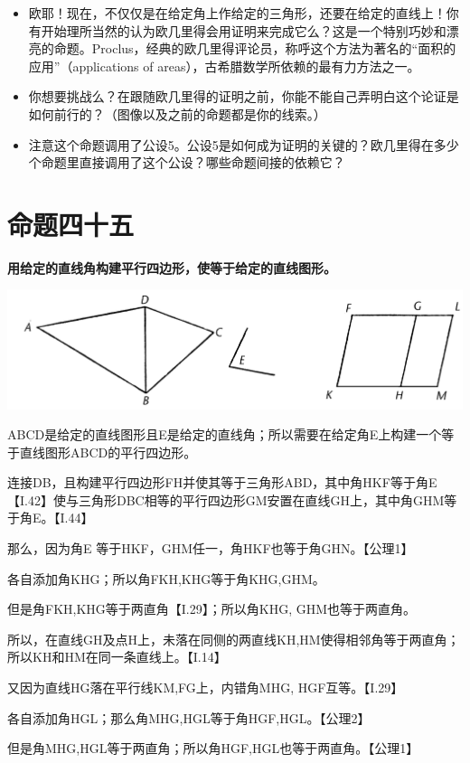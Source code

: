 \documentclass[
]{book}
\providecommand{\tightlist}{%
  \setlength{\itemsep}{0pt}\setlength{\parskip}{0pt}}
\begin{document}
\begin{itemize}
\tightlist
\item
  欧耶！现在，不仅仅是在给定角上作给定的三角形，还要在给定的直线上！你有开始理所当然的认为欧几里得会用证明来完成它么？这是一个特别巧妙和漂亮的命题。Proclus，经典的欧几里得评论员，称呼这个方法为著名的``面积的应用''（applications of areas），古希腊数学所依赖的最有力方法之一。
\item
  你想要挑战么？在跟随欧几里得的证明之前，你能不能自己弄明白这个论证是如何前行的？（图像以及之前的命题都是你的线索。）
\item
  注意这个命题调用了公设5。公设5是如何成为证明的关键的？欧几里得在多少个命题里直接调用了这个公设？哪些命题间接的依赖它？
\end{itemize}

\hypertarget{ux547dux9898ux56dbux5341ux4e94}{%
\section{命题四十五}\label{ux547dux9898ux56dbux5341ux4e94}}

\textbf{用给定的直线角构建平行四边形，使等于给定的直线图形。}

\includegraphics[width=0.5\linewidth]{./image/img549}

ABCD是给定的直线图形且E是给定的直线角；所以需要在给定角E上构建一个等于直线图形ABCD的平行四边形。

连接DB，且构建平行四边形FH并使其等于三角形ABD，其中角HKF等于角E【I.42】使与三角形DBC相等的平行四边形GM安置在直线GH上，其中角GHM等于角E。【I.44】

那么，因为角E 等于HKF，GHM任一，角HKF也等于角GHN。【公理1】

各自添加角KHG；所以角FKH,KHG等于角KHG,GHM。

但是角FKH,KHG等于两直角【I.29】；所以角KHG, GHM也等于两直角。

所以，在直线GH及点H上，未落在同侧的两直线KH,HM使得相邻角等于两直角；所以KH和HM在同一条直线上。【I.14】

又因为直线HG落在平行线KM,FG上，内错角MHG, HGF互等。【I.29】

各自添加角HGL；那么角MHG,HGL等于角HGF,HGL。【公理2】

但是角MHG,HGL等于两直角；所以角HGF,HGL也等于两直角。【公理1】
\end{document}

